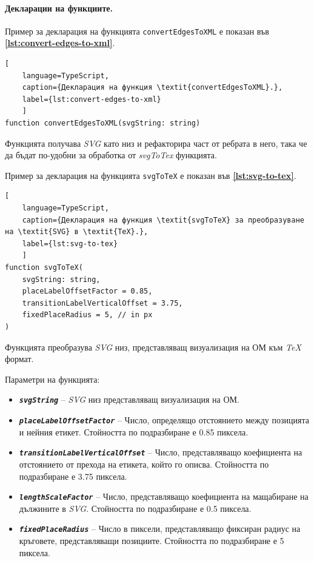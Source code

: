 \paragraph{Декларации на функциите.}
\mbox{}

Пример за декларация на функцията \texttt{convertEdgesToXML} е показан във \textbf{\autoref{lst:convert-edges-to-xml}}.
\begin{lstlisting}[
	language=TypeScript,
	caption={Декларация на функция \textit{convertEdgesToXML}.},
	label={lst:convert-edges-to-xml}
	]
function convertEdgesToXML(svgString: string)
\end{lstlisting}

Функцията получава \textit{SVG} като низ и рефакторира част от ребрата в него, така че да бъдат по-удобни за обработка от \textit{svgToTex} функцията.

\vspace{0.55cm}

Пример за декларация на функцията \texttt{svgToTeX} е показан във \textbf{\autoref{lst:svg-to-tex}}.
\begin{lstlisting}[
	language=TypeScript,
	caption={Декларация на функция \textit{svgToTeX} за преобразуване на \textit{SVG} в \textit{TeX}.},
	label={lst:svg-to-tex}
	]
function svgToTeX(
    svgString: string,
    placeLabelOffsetFactor = 0.85,
    transitionLabelVerticalOffset = 3.75,
    fixedPlaceRadius = 5, // in px
)
\end{lstlisting}

Функцията преобразува \textit{SVG} низ, представляващ визуализация на ОМ към \textit{TeX} формат. 

Параметри на функцията:

\vspace{-0.3cm}

\begin{itemize}
	\item \texttt{\textbf{\textit{svgString}}} -- \textit{SVG} низ представляващ визуализация на ОМ.
	\item \texttt{\textbf{\textit{placeLabelOffsetFactor}}} -- Число, определящо отстоянието между позицията и нейния етикет. Стойността по подразбиране е 0.85 пиксела.
	\item \texttt{\textbf{\textit{transitionLabelVerticalOffset}}} -- Число, представляващо коефициента на отстоянието от прехода на етикета, който го описва. Стойността по подразбиране е 3.75 пиксела.
	\item \texttt{\textbf{\textit{lengthScaleFactor}}} -- Число, представляващо коефициента на мащабиране на дължините в \textit{SVG}. Стойността по подразбиране е 0.5 пиксела.
	\item \texttt{\textbf{\textit{fixedPlaceRadius}}} -- Число в пиксели, представляващо фиксиран радиус на кръговете, представляващи позициите. Стойността по подразбиране е 5 пиксела.
\end{itemize}

